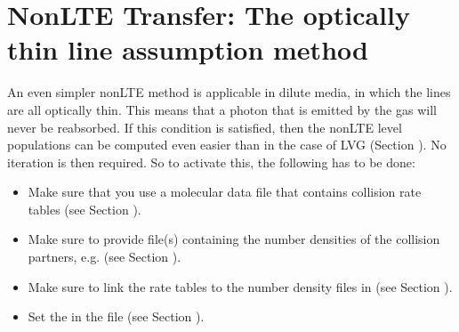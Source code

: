 \documentclass[letterpaper,10pt,english]{sphinxmanual}
\begin{document}
\section{Non\sphinxhyphen{}LTE Transfer: The optically thin line assumption method}
\label{\detokenize{lineradtrans:non-lte-transfer-the-optically-thin-line-assumption-method}}\label{\detokenize{lineradtrans:sec-optthinpop}}
An even simpler non\sphinxhyphen{}LTE method is applicable in  dilute
media, in which the lines are all optically thin. This means that
a photon that is emitted by the gas will never be reabsorbed.
If this condition is satisfied, then the non\sphinxhyphen{}LTE level populations
can be computed even easier than in the case of LVG (Section
{\hyperref[\detokenize{lineradtrans:sec-lvg}]{}}). No iteration is then required. So to activate
this, the following has to be done:
\begin{itemize}
\item {} 
Make sure that you use a molecular data file that contains
collision rate tables (see Section {\hyperref[\detokenize{lineradtrans:sec-molecule-xxx-inp}]{}}).

\item {} 
Make sure to provide file(s) containing the number densities
of the collision partners, e.g. 
(see Section {\hyperref[\detokenize{lineradtrans:sec-collpartner}]{}}).

\item {} 
Make sure to link the rate tables to the number density
files in  (see Section {\hyperref[\detokenize{lineradtrans:sec-line-dot-inp}]{}}).

\item {} 
Set the  in the 
file (see Section {\hyperref[\detokenize{inputoutputfiles:sec-radmc-inp}]{}}).

\end{itemize}
\end{document}
